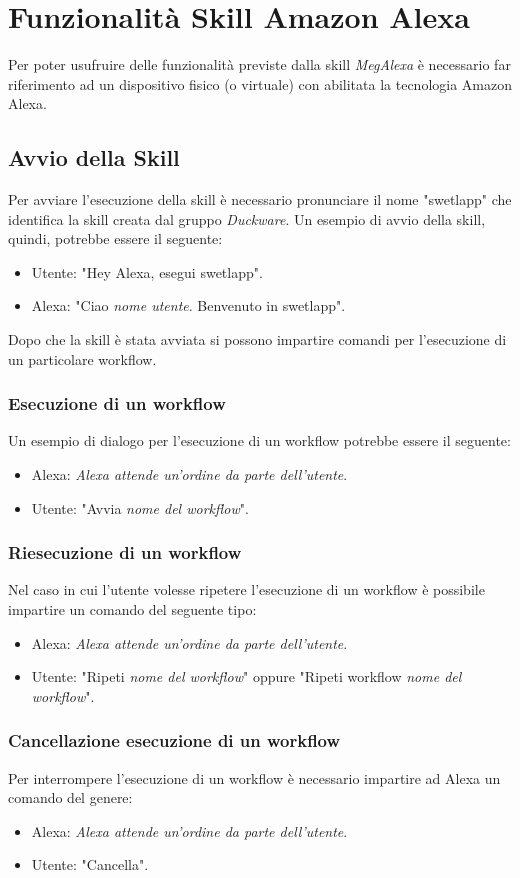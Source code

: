 \clearpage
\section{Funzionalità Skill Amazon Alexa}
\label{sec:sec_interazione_amazon_alexa}
Per poter usufruire delle funzionalità previste dalla skill \textit{MegAlexa} è necessario far riferimento ad un dispositivo fisico (o virtuale) con abilitata la tecnologia Amazon Alexa.
\subsection{Avvio della Skill}
Per avviare l'esecuzione della skill è necessario pronunciare il nome "swetlapp" che identifica la skill creata dal gruppo \textit{Duckware}. Un esempio di avvio della skill, quindi, potrebbe essere il seguente:
\begin{itemize}
	\item Utente: "Hey Alexa, esegui swetlapp".
	\item Alexa: "Ciao \textit{nome utente}. Benvenuto in swetlapp".
\end{itemize}
Dopo che la skill è stata avviata si possono impartire comandi per l'esecuzione di un particolare workflow.
\subsubsection{Esecuzione di un workflow}
Un esempio di dialogo per l'esecuzione di un workflow potrebbe essere il seguente:
\begin{itemize}
	\item Alexa: \textit{Alexa attende un'ordine da parte dell'utente}.
	\item Utente: "Avvia \textit{nome del workflow}".
\end{itemize}
\subsubsection{Riesecuzione di un workflow}
Nel caso in cui l'utente volesse ripetere l'esecuzione di un workflow è possibile impartire un comando del seguente tipo:
\begin{itemize}
	\item Alexa: \textit{Alexa attende un'ordine da parte dell'utente}.
	\item Utente: "Ripeti \textit{nome del workflow}" oppure "Ripeti workflow \textit{nome del workflow}".
\end{itemize}
\subsubsection{Cancellazione esecuzione di un workflow}
Per interrompere l'esecuzione di un workflow è necessario impartire ad Alexa un comando del genere:
\begin{itemize}
	\item Alexa: \textit{Alexa attende un'ordine da parte dell'utente}.
	\item Utente: "Cancella".
\end{itemize}
